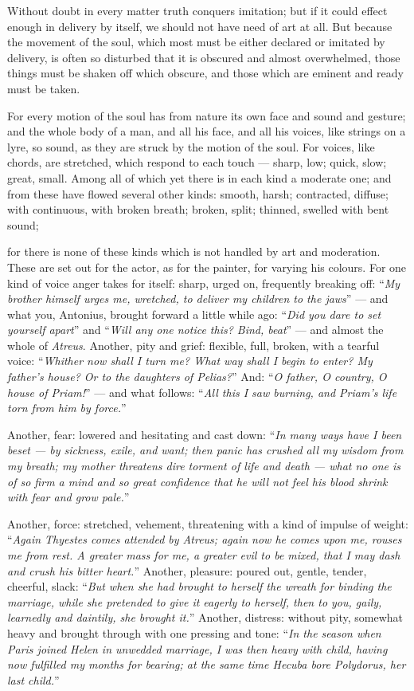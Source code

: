  Without doubt in every matter truth conquers imitation; but if it could effect enough in delivery by itself, we should not have need of art at all. But because the movement of the soul, which most must be either declared or imitated by delivery, is often so disturbed that it is obscured and almost overwhelmed, those things must be shaken off which obscure, and those which are eminent and ready must be taken.

 For every motion of the soul has from nature its own face and sound and gesture; and the whole body of a man, and all his face, and all his voices, like strings on a lyre, so sound, as they are struck by the motion of the soul. For voices, like chords, are stretched, which respond to each touch — sharp, low; quick, slow; great, small. Among all of which yet there is in each kind a moderate one; and from these have flowed several other kinds: smooth, harsh; contracted, diffuse; with continuous, with broken breath; broken, split; thinned, swelled with bent sound;

 for there is none of these kinds which is not handled by art and moderation. These are set out for the actor, as for the painter, for varying his colours. For one kind of voice anger takes for itself: sharp, urged on, frequently breaking off: ``\textit{My brother himself urges me, wretched, to deliver my children to the jaws}'' — and what you, Antonius, brought forward a little while ago: ``\textit{Did you dare to set yourself apart}'' and ``\textit{Will any one notice this? Bind, beat}'' — and almost the whole of \textit{Atreus}. Another, pity and grief: flexible, full, broken, with a tearful voice: ``\textit{Whither now shall I turn me? What way shall I begin to enter? My father's house? Or to the daughters of Pelias?}'' And: ``\textit{O father, O country, O house of Priam!}'' — and what follows: ``\textit{All this I saw burning, and Priam's life torn from him by force.}''

 Another, fear: lowered and hesitating and cast down: ``\textit{In many ways have I been beset — by sickness, exile, and want; then panic has crushed all my wisdom from my breath; my mother threatens dire torment of life and death — what no one is of so firm a mind and so great confidence that he will not feel his blood shrink with fear and grow pale.}''

 Another, force: stretched, vehement, threatening with a kind of impulse of weight: ``\textit{Again Thyestes comes attended by Atreus; again now he comes upon me, rouses me from rest. A greater mass for me, a greater evil to be mixed, that I may dash and crush his bitter heart.}'' Another, pleasure: poured out, gentle, tender, cheerful, slack: ``\textit{But when she had brought to herself the wreath for binding the marriage, while she pretended to give it eagerly to herself, then to you, gaily, learnedly and daintily, she brought it.}'' Another, distress: without pity, somewhat heavy and brought through with one pressing and tone: ``\textit{In the season when Paris joined Helen in unwedded marriage, I was then heavy with child, having now fulfilled my months for bearing; at the same time Hecuba bore Polydorus, her last child.}''

